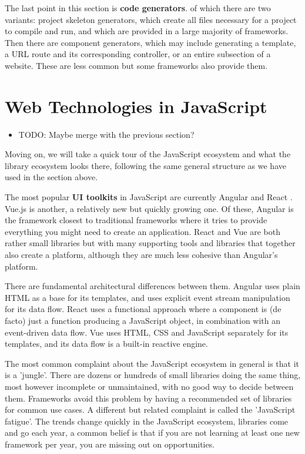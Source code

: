 \documentclass[english,odsaz]{fitthesis}
\begin{document}
The last point in this section is \textbf{code generators}. of which there are two
variants: project skeleton generators, which create all files necessary for a
project to compile and run, and which are provided in a large majority of
frameworks. Then there are component generators, which may include generating a
template, a URL route and its corresponding controller, or an entire subsection
of a website. These are less common but some frameworks also provide them.

\section{Web Technologies in JavaScript}
\label{sec:orgfec6168}
\begin{itemize}
\item TODO: Maybe merge with the previous section?
\end{itemize}

Moving on, we will take a quick tour of the JavaScript ecosystem and what the
library ecosystem looks there, following the same general structure as we have
used in the section above.

The most popular \textbf{UI toolkits} in JavaScript are currently Angular \cite{angular}
and React \cite{react}. Vue.js \cite{vuejs} is another, a relatively new but quickly
growing one. Of these, Angular is the framework closest to traditional
frameworks where it tries to provide everything you might need to create an
application. React and Vue are both rather small libraries but with many
supporting tools and libraries that together also create a platform, although
they are much less cohesive than Angular's platform.

There are fundamental architectural differences between them. Angular uses plain
HTML as a base for its templates, and uses explicit event stream manipulation
for its data flow. React uses a functional approach where a component is (de
facto) just a function producing a JavaScript object, in combination with an
event-driven data flow. Vue uses HTML, CSS and JavaScript separately for its
templates, and its data flow is a built-in reactive engine.

The most common complaint about the JavaScript ecosystem in general is that it
is a 'jungle'. There are dozens or hundreds of small libraries doing the same
thing, most however incomplete or unmaintained, with no good way to decide
between them. Frameworks avoid this problem by having a recommended set of
libraries for common use cases. A different but related complaint is called the
'JavaScript fatigue'. The trends change quickly in the JavaScript ecosystem,
libraries come and go each year, a common belief is that if you are not learning
at least one new framework per year, you are missing out on opportunities.
\end{document}
